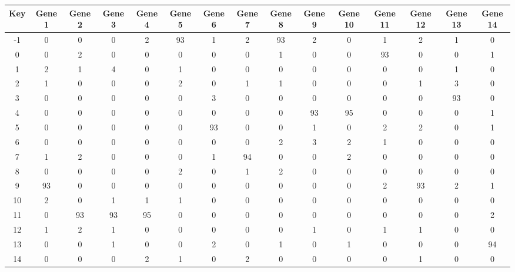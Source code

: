 \begin{tabular}{|c|c|c|c|c|c|c|c|c|c|c|c|c|c|c|}
\hline
Key & Gene 1 & Gene 2 & Gene 3 & Gene 4 & Gene 5 & Gene 6 & Gene 7 & Gene 8 & Gene 9 & Gene 10 & Gene 11 & Gene 12 & Gene 13 & Gene 14 \\
\hline
-1 & 0 & 0 & 0 & 2 & 93 & 1 & 2 & 93 & 2 & 0 & 1 & 2 & 1 & 0 \\
0 & 0 & 2 & 0 & 0 & 0 & 0 & 0 & 1 & 0 & 0 & 93 & 0 & 0 & 1 \\
1 & 2 & 1 & 4 & 0 & 1 & 0 & 0 & 0 & 0 & 0 & 0 & 0 & 1 & 0 \\
2 & 1 & 0 & 0 & 0 & 2 & 0 & 1 & 1 & 0 & 0 & 0 & 1 & 3 & 0 \\
3 & 0 & 0 & 0 & 0 & 0 & 3 & 0 & 0 & 0 & 0 & 0 & 0 & 93 & 0 \\
4 & 0 & 0 & 0 & 0 & 0 & 0 & 0 & 0 & 93 & 95 & 0 & 0 & 0 & 1 \\
5 & 0 & 0 & 0 & 0 & 0 & 93 & 0 & 0 & 1 & 0 & 2 & 2 & 0 & 1 \\
6 & 0 & 0 & 0 & 0 & 0 & 0 & 0 & 2 & 3 & 2 & 1 & 0 & 0 & 0 \\
7 & 1 & 2 & 0 & 0 & 0 & 1 & 94 & 0 & 0 & 2 & 0 & 0 & 0 & 0 \\
8 & 0 & 0 & 0 & 0 & 2 & 0 & 1 & 2 & 0 & 0 & 0 & 0 & 0 & 0 \\
9 & 93 & 0 & 0 & 0 & 0 & 0 & 0 & 0 & 0 & 0 & 2 & 93 & 2 & 1 \\
10 & 2 & 0 & 1 & 1 & 1 & 0 & 0 & 0 & 0 & 0 & 0 & 0 & 0 & 0 \\
11 & 0 & 93 & 93 & 95 & 0 & 0 & 0 & 0 & 0 & 0 & 0 & 0 & 0 & 2 \\
12 & 1 & 2 & 1 & 0 & 0 & 0 & 0 & 0 & 1 & 0 & 1 & 1 & 0 & 0 \\
13 & 0 & 0 & 1 & 0 & 0 & 2 & 0 & 1 & 0 & 1 & 0 & 0 & 0 & 94 \\
14 & 0 & 0 & 0 & 2 & 1 & 0 & 2 & 0 & 0 & 0 & 0 & 1 & 0 & 0 \\
\hline
\end{tabular}